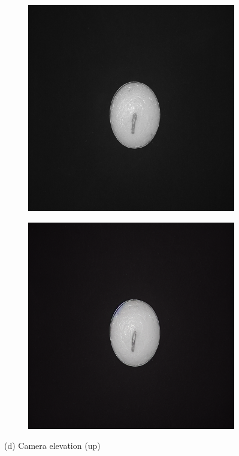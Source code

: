 \documentclass[12pt,DIV14,BCOR12mm,a4paper,footinclude=false,headinclude,parskip=half-,twoside,openright,cleardoublepage=empty,toc=index,bibliography=totoc,listof=totoc]{scrreprt}
\numberwithin{equation}{chapter}
\begin{document}
\begin{figure}\ContinuedFloat
    \centering

    \begin{subfigure}[t]{0.45\textwidth}
        \centering
        \includegraphics[width=\textwidth]{../media/diff_candles_up_real.png}
    \end{subfigure}%
    \hspace{0.02\textwidth}%
    \begin{subfigure}[t]{0.45\textwidth}
        \centering
        \includegraphics[width=\textwidth]{../media/diff_candles_up_fake.png}
    \end{subfigure}
    \caption*{(d) Camera elevation (up)}


\end{figure}
\end{document}
